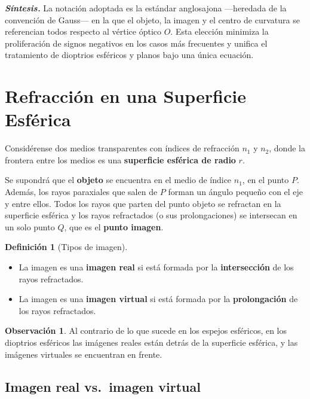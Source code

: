 \documentclass[12pt, a4paper]{article}
\theoremstyle{definition}
\newtheorem{definicion}{Definición}[section]
\newtheorem{observacion}{Observación}[section]
\begin{document}
\textit{\textbf{Síntesis.}} La notación adoptada es la estándar anglosajona —heredada de
la convención de Gauss— en la que el objeto, la imagen y el centro de curvatura se
referencian todos respecto al vértice óptico \(O\). Esta elección minimiza la proliferación
de signos negativos en los casos más frecuentes y unifica el tratamiento de dioptrios
esféricos y planos bajo una única ecuación.

\section{Refracción en una Superficie Esférica}

Considérense dos medios transparentes con índices de refracción \(n_1\) y \(n_2\), donde
la frontera entre los medios es una \textbf{superficie esférica de radio} \(r\).

Se supondrá que el \textbf{objeto} se encuentra en el medio de índice \(n_1\), en el punto
\(P\). Además, los rayos paraxiales que salen de \(P\) forman un ángulo pequeño con el eje
y entre ellos. Todos los rayos que parten del punto objeto se refractan en la superficie
esférica y los rayos refractados (o sus prolongaciones) se intersecan en un solo punto
\(Q\), que es el \textbf{punto imagen}.

\begin{definicion}[Tipos de imagen]
\begin{itemize}
  \item La imagen es una \textbf{imagen real} si está formada por la \textbf{intersección}
        de los rayos refractados.
  \item La imagen es una \textbf{imagen virtual} si está formada por la
        \textbf{prolongación} de los rayos refractados.
\end{itemize}
\end{definicion}

\begin{observacion}
Al contrario de lo que sucede en los espejos esféricos, en los dioptrios esféricos las
imágenes reales están detrás de la superficie esférica, y las imágenes virtuales se
encuentran en frente.
\end{observacion}

\subsection*{Imagen real vs.\ imagen virtual}
\end{document}
